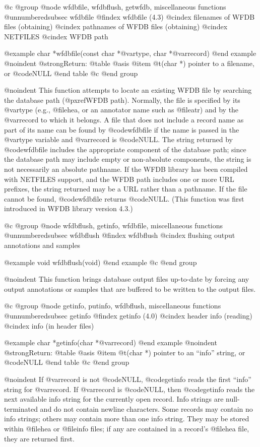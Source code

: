 {{{{{{{{{@c @group
@node     wfdbfile, wfdbflush, getwfdb, miscellaneous functions
@unnumberedsubsec wfdbfile
@findex wfdbfile (4.3)
@cindex filenames of WFDB files (obtaining)
@cindex pathnames of WFDB files (obtaining)
@cindex NETFILES
@cindex WFDB path

@example
char *wfdbfile(const char *@var{type}, char *@var{record})
@end example
@noindent
@strong{Return:}
@table @asis
@item @t{(char *)}
pointer to a filename, or @code{NULL}
@end table
@c @end group

@noindent
This function attempts to locate an existing WFDB file by searching the
database path (@pxref{WFDB path}).  Normally, the file is specified by its
@var{type} (e.g., @file{hea}, or an annotator name such as @file{atr})
and by the @var{record} to which it belongs.  A file that does not include a
record name as part of its name can be found by @code{wfdbfile} if the name is
passed in the @var{type} variable and @var{record} is @code{NULL}.  The string
returned by @code{wfdbfile} includes the appropriate component of the database
path; since the database path may include empty or non-absolute components, the
string is not necessarily an absolute pathname.  If the WFDB library has been
compiled with NETFILES support, and the WFDB path includes one or more
URL prefixes, the string returned may be a URL rather than a pathname.  If the
file cannot be found, @code{wfdbfile} returns @code{NULL}.  (This function was
first introduced in WFDB library version 4.3.)

@c @group
@node     wfdbflush, getinfo, wfdbfile, miscellaneous functions
@unnumberedsubsec wfdbflush
@findex wfdbflush
@cindex flushing output annotations and samples

@example
void wfdbflush(void)
@end example
@c @end group

@noindent
This function brings database output files up-to-date by forcing any
output annotations or samples that are buffered to be written to the
output files.

@c @group
@node     getinfo, putinfo, wfdbflush, miscellaneous functions
@unnumberedsubsec getinfo
@findex getinfo (4.0)
@cindex header info (reading) 
@cindex info (in header files)

@example
char *getinfo(char *@var{record})
@end example
@noindent
@strong{Return:}
@table @asis
@item @t{(char *)}
pointer to an ``info'' string, or @code{NULL}
@end table
@c @end group

@noindent
If @var{record} is not @code{NULL}, @code{getinfo} reads the first ``info''
string for @var{record}.  If @var{record} is @code{NULL}, then @code{getinfo}
reads the next available info string for the currently open record.  Info
strings are null-terminated and do not contain newline characters.  Some
records may contain no info strings; others may contain more than one info
string.  They may be stored within @file{hea} or @file{info} files; if any are
contained in a record's @file{hea} file, they are returned first.

}}}}}}}}}
